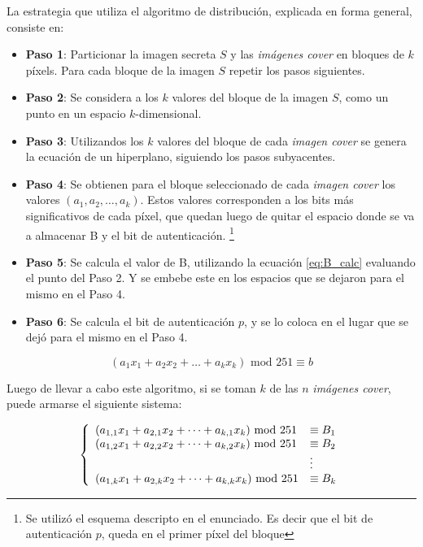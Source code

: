 \documentclass{article}
\begin{document}
La estrategia que utiliza el algoritmo de distribución, explicada en forma general, consiste en:
\begin{itemize}
 \item \textbf{Paso 1}: Particionar la imagen secreta $S$ y las \emph{imágenes cover} en bloques de $k$ píxels.
 Para cada bloque de la imagen $S$ repetir los pasos siguientes.
 \item \textbf{Paso 2}: Se considera a los $k$ valores del bloque de la imagen $S$, como un punto en un espacio $k$-dimensional.
 \item \textbf{Paso 3}: Utilizandos los $k$ valores del bloque de cada \emph{imagen cover} se genera la ecuación de un hiperplano,
 siguiendo los pasos subyacentes.
 \item \textbf{Paso 4}: Se obtienen para el bloque seleccionado de cada \emph{imagen cover} los valores $(a_1, a_2, \dots, a_k)$.
 Estos valores corresponden a los bits más significativos de cada píxel, que quedan luego de quitar el espacio donde se va a 
 almacenar B y el bit de autenticación.
 \footnote{Se utilizó el esquema descripto en el enunciado. Es decir que el bit de autenticación $p$, queda en el primer píxel del
 bloque}
 \item \textbf{Paso 5}: Se calcula el valor de B, utilizando la ecuación \ref{eq:B_calc} evaluando el punto del Paso 2. Y se embebe
 este en los espacios que se dejaron para el mismo en el Paso 4.
 \item \textbf{Paso 6}: Se calcula el bit de autenticación $p$, y se lo coloca en el lugar que se dejó para el mismo en el Paso 4.
\end{itemize}

\begin{equation}
 \label{eq:B_calc}
 (a_1 x_1 + a_2 x_2 + \dots + a_k x_k) \mbox{ mod } 251 \equiv b
\end{equation}

Luego de llevar a cabo este algoritmo, si se toman $k$ de las $n$ \emph{imágenes cover}, puede armarse el siguiente sistema:


\begin{equation}
  \label{eq:system}
  \left\{ 
  \begin{array}{l l}
  (a_{1,1} x_1 + a_{2,1} x_2 + \dots + a_{k,1} x_k) \mbox{ mod } 251  & \equiv B_1\\
  (a_{1,2} x_1 + a_{2,2} x_2 + \dots + a_{k,2} x_k) \mbox{ mod } 251  & \equiv B_2\\
  \mbox{ } & \vdots \\
  (a_{1,k} x_1 + a_{2,k} x_2 + \dots + a_{k,k} x_k) \mbox{ mod } 251  & \equiv B_k\\
  \end{array} \right.
\end{equation}
\end{document}
